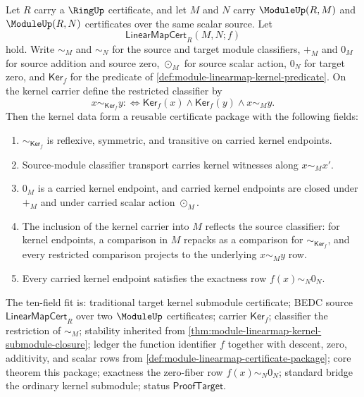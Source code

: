\begin{theorem}
\label{thm:module-linearmap-kernel-certificate-package}
Let $R$ carry a $\RingUp$ certificate, and let $M$ and $N$ carry $\ModuleUp(R,M)$ and $\ModuleUp(R,N)$ certificates over the same scalar source. Let
$$
\mathsf{LinearMapCert}_R(M,N;f)
$$
hold. Write $\sim_M$ and $\sim_N$ for the source and target module classifiers, $+_M$ and $0_M$ for source addition and source zero, $\odot_M$ for source scalar action, $0_N$ for target zero, and $\mathsf{Ker}_f$ for the predicate of \autoref{def:module-linearmap-kernel-predicate}. On the kernel carrier define the restricted classifier by
$$
x\sim_{\mathsf{Ker}_f}y :\Longleftrightarrow \mathsf{Ker}_f(x)\land\mathsf{Ker}_f(y)\land x\sim_My.
$$
Then the kernel data form a reusable certificate package with the following fields:
\begin{enumerate}
\item $\sim_{\mathsf{Ker}_f}$ is reflexive, symmetric, and transitive on carried kernel endpoints.
\item Source-module classifier transport carries kernel witnesses along $x\sim_Mx'$.
\item $0_M$ is a carried kernel endpoint, and carried kernel endpoints are closed under $+_M$ and under carried scalar action $\odot_M$.
\item The inclusion of the kernel carrier into $M$ reflects the source classifier: for kernel endpoints, a comparison in $M$ repacks as a comparison for $\sim_{\mathsf{Ker}_f}$, and every restricted comparison projects to the underlying $x\sim_My$ row.
\item Every carried kernel endpoint satisfies the exactness row $f(x)\sim_N0_N$.
\end{enumerate}
The ten-field fit is: traditional target kernel submodule certificate; BEDC source $\mathsf{LinearMapCert}_R$ over two $\ModuleUp$ certificates; carrier $\mathsf{Ker}_f$; classifier the restriction of $\sim_M$; stability inherited from \autoref{thm:module-linearmap-kernel-submodule-closure}; ledger the function identifier $f$ together with descent, zero, additivity, and scalar rows from \autoref{def:module-linearmap-certificate-package}; core theorem this package; exactness the zero-fiber row $f(x)\sim_N0_N$; standard bridge the ordinary kernel submodule; status $\mathsf{ProofTarget}$.
\end{theorem}
